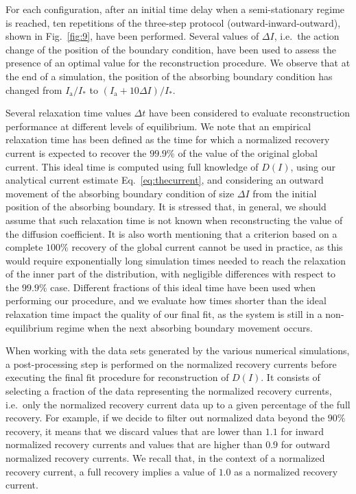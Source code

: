 {For each configuration, after an initial time delay when a semi-stationary regime is reached, ten repetitions of the three-step protocol (outward-inward-outward), shown in Fig.~\ref{fig:9}, have been performed. Several values of $\Delta I$, i.e.\ the action change of the position of the boundary condition, have been used to assess the presence of an optimal value for the reconstruction procedure. We observe that at the end of a simulation, the position of the absorbing boundary condition has changed from $I_\mathrm{a}/I_\ast$ to $(I_\mathrm{a} + 10\Delta I) / I_\ast$. 

Several relaxation time values $\Delta t$ have been considered to evaluate reconstruction performance at different levels of equilibrium. We note that an empirical relaxation time has been defined as the time for which a normalized recovery current is expected to recover the $99.9\%$ of the value of the original global current. This ideal time is computed using full knowledge of $D(I)$, using our analytical current estimate Eq.~\eqref{eq:thecurrent}, and considering an outward movement of the absorbing boundary condition of size $\Delta I$ from the initial position of the absorbing boundary. It is stressed that, in general, we should assume that such relaxation time is not known when reconstructing the value of the diffusion coefficient. It is also worth mentioning that a criterion based on a complete $100\%$ recovery of the global current cannot be used in practice, as this would require exponentially long simulation times needed to reach the relaxation of the inner part of the distribution, with negligible differences with respect to the $99.9\%$ case. Different fractions of this ideal time have been used when performing our procedure, and we evaluate how times shorter than the ideal relaxation time impact the quality of our final fit, as the system is still in a non-equilibrium regime when the next absorbing boundary movement occurs.

When working with the data sets generated by the various numerical simulations, a post-processing step is performed on the normalized recovery currents before executing the final fit procedure for reconstruction of $D(I)$. It consists of selecting a fraction of the data representing the normalized recovery currents, i.e.\ only the normalized recovery current data up to a given percentage of the full recovery. For example, if we decide to filter out normalized data beyond the $90\%$ recovery, it means that we discard values that are lower than $1.1$ for inward normalized recovery currents and values that are higher than $0.9$ for outward normalized recovery currents. We recall that, in the context of a normalized recovery current, a full recovery implies a value of $1.0$ as a normalized recovery current.

}
